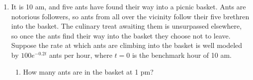 \documentclass[main]{subfiles}
\begin{document}
\begin{enumerate}
\begin{enumerate}
  \item
    \begin{problem}[\vfill]
      $\displaystyle \int \frac{e^x}{e^{2x} + 2 e^x + 1}\,dx$
    \end{problem}

    \begin{solution}
      There's not an obvious substitution to use here, but we might try
       because everything in the integral can be written in
      terms of that, and we see  in the integral:
      \begin{align*}
        \int \frac{e^x}{e^{2x} + 2 e^x + 1}\,dx &= \int
        \frac{\subd{e^x}}{(\sub{e^x})^2 + 2 \sub{e^x} + 1}\,\subd{dx} \\ 
        &= \int \frac{1}{u^2 + 2u + 1}\,du \\
        &= \int \frac{1}{(u + 1)^2}\,du \\
        \intertext{Now, we see a composition of functions, so we might try
          substituting for the inner function: if \sub{$v = u + 1$}, then
          \subd{$dv = du$}, and 
          so the previous integral can be rewritten as}
        &= \int \frac{1}{\sub{v}^2}\,\subd{dv} \\
        &= \int v^{-2}\,dv \\
        &= - v^{-1} + C \\
        &= - \frac{1}{v} + C \\
        &= - \frac{1}{u + 1} + C \\
        &= \boxed{- \frac{1}{e^x + 1} + C}
      \end{align*}
    \end{solution}

  \end{enumerate}
  
  \pspace{\newpage}


\item  It is 10 am, and five ants have found their way into a picnic
  basket.  Ants are notorious followers, so ants from all over the
  vicinity follow their five brethren into the basket. The culinary treat
  awaiting them is unsurpassed elsewhere, so once the ants find their way
  into the basket they choose not to leave.  Suppose the rate at which
  ants are climbing into the basket is well modeled by $100 e^{-0.2t}$
  ants per hour, where $t=0$ is the benchmark hour of 10 am.
  \begin{enumerate}
  \item
    \begin{problem}[\vfill]
      How many ants are in the basket at 1 pm?
    \end{problem}


\end{enumerate}
\end{enumerate}
\end{document}
